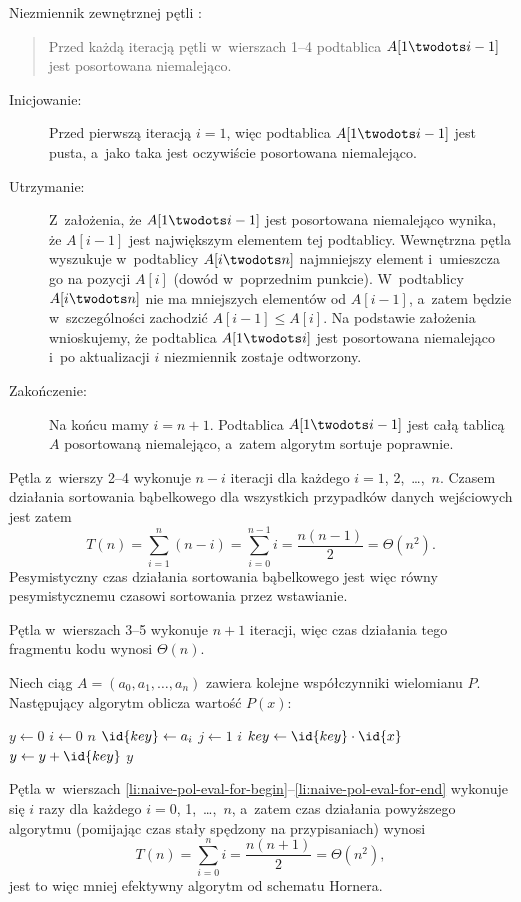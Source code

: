 \subproblem %
Niezmiennik zewnętrznej pętli :
\begin{quote}
Przed każdą iteracją pętli  w~wierszach 1\nobreakdash--4 podtablica $A[1\twodots i-1]$ jest posortowana niemalejąco.
\end{quote}
\begin{description}
	\item[Inicjowanie:] Przed pierwszą iteracją $i=1$, więc podtablica $A[1\twodots i-1]$ jest pusta, a~jako taka jest oczywiście posortowana niemalejąco.
	\item[Utrzymanie:] Z~założenia, że $A[1\twodots i-1]$ jest posortowana niemalejąco wynika, że $A[i-1]$ jest największym elementem tej podtablicy. Wewnętrzna pętla  wyszukuje w~podtablicy $A[i\twodots n]$ najmniejszy element i~umieszcza go na pozycji $A[i]$ (dowód w~poprzednim punkcie). W~podtablicy $A[i\twodots n]$ nie ma mniejszych elementów od $A[i-1]$, a~zatem będzie w~szczególności zachodzić $A[i-1]\le A[i]$. Na podstawie założenia wnioskujemy, że podtablica $A[1\twodots i]$ jest posortowana niemalejąco i~po aktualizacji $i$ niezmiennik zostaje odtworzony.
	\item[Zakończenie:] Na końcu mamy $i=n+1$. Podtablica $A[1\twodots i-1]$ jest całą tablicą $A$ posortowaną niemalejąco, a~zatem algorytm sortuje poprawnie.
\end{description}

\subproblem %
Pętla  z~wierszy 2\nobreakdash--4 wykonuje $n-i$ iteracji dla każdego $i=1$, 2,~\dots,~$n$. Czasem działania sortowania bąbelkowego dla wszystkich przypadków danych wejściowych jest zatem
\[
	T(n) = \sum_{i=1}^n(n-i) = \sum_{i=0}^{n-1}i = \frac{n(n-1)}{2} = \Theta(n^2).
\]
Pesymistyczny czas działania sortowania bąbelkowego jest więc równy pesymistycznemu czasowi sortowania przez wstawianie.


\subproblem %
Pętla  w~wierszach 3\nobreakdash--5 wykonuje $n+1$ iteracji, więc czas działania tego fragmentu kodu wynosi $\Theta(n)$.

\subproblem %
Niech ciąg $A=(a_0,a_1,\dots,a_n)$ zawiera kolejne współczynniki wielomianu $P$. Następujący algorytm oblicza wartość $P(x)$:
\begin{codebox}
\li	$y\gets0$
\li	\For $i\gets0$ \To $n$
\li		\Do
			$\id{key}\gets a_i$
\li			\For $j\gets1$ \To $i$ \label{li:naive-pol-eval-for-begin}
\li				\Do
					$key\gets\id{key}\cdot\id{x}$
				\End \label{li:naive-pol-eval-for-end}
\li			$y\gets y+\id{key}$
		\End
\li	\Return $y$
\end{codebox}
Pętla  w~wierszach \ref{li:naive-pol-eval-for-begin}\nobreakdash--\ref{li:naive-pol-eval-for-end} wykonuje się $i$ razy dla każdego $i=0$, 1,~\dots,~$n$, a~zatem czas działania powyższego algorytmu (pomijając czas stały spędzony na przypisaniach) wynosi
\[
	T(n) = \sum_{i=0}^ni = \frac{n(n+1)}{2} = \Theta(n^2),
\]
jest to więc mniej efektywny algorytm od schematu Hornera.


